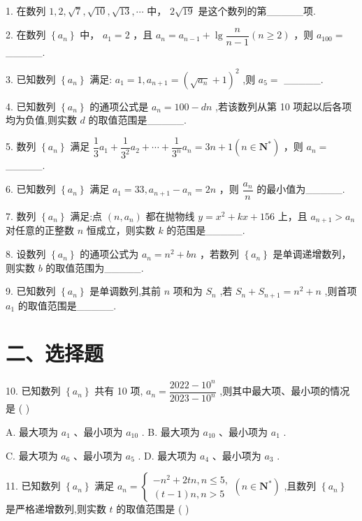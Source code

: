1. 在数列 $1,2,\sqrt{7},\sqrt{10},\sqrt{13},\cdots$ 中， $2\sqrt{19}$ 是这个数列的第\_\_\_\_\_项.

2. 在数列 $\left\{  {a}_{n}\right\}$ 中， ${a}_{1} = 2$ ，且 ${a}_{n} = {a}_{n - 1} + \lg \dfrac{n}{n - 1}\left( {n \geq  2}\right)$ ，则 ${a}_{100} =$ \_\_\_\_\_.

3. 已知数列 $\left\{  {a}_{n}\right\}$ 满足: ${a}_{1} = 1,{a}_{n + 1} = {\left( \sqrt{{a}_{n}} + 1\right) }^{2}$ ,则 ${a}_{5} =$ \_\_\_\_\_.

4. 已知数列 $\left\{  {a}_{n}\right\}$ 的通项公式是 ${a}_{n} = {100} - {dn}$ ,若该数列从第 10 项起以后各项均为负值,则实数 $d$ 的取值范围是\_\_\_\_\_.

5. 数列 $\left\{  {a}_{n}\right\}$ 满足 $\dfrac{1}{3}{a}_{1} + \dfrac{1}{{3}^{2}}{a}_{2} + \cdots  + \dfrac{1}{{3}^{n}}{a}_{n} = {3n} + 1\left( {n \in  {\mathbf{N}}^{ * }}\right)$ ，则 ${a}_{n} =$ \_\_\_\_\_.

6. 已知数列 $\left\{  {a}_{n}\right\}$ 满足 ${a}_{1} = {33},{a}_{n + 1} - {a}_{n} = {2n}$ ，则 $\dfrac{{a}_{n}}{n}$ 的最小值为\_\_\_\_\_.

7. 数列 $\left\{  {a}_{n}\right\}$ 满足:点 $\left( {n,{a}_{n}}\right)$ 都在抛物线 $y = {x}^{2} + {kx} + {156}$ 上，且 ${a}_{n + 1} > {a}_{n}$ 对任意的正整数 $n$ 恒成立，则实数 $k$ 的范围是\_\_\_\_\_.

8. 设数列 $\left\{  {a}_{n}\right\}$ 的通项公式为 ${a}_{n} = {n}^{2} + {bn}$ ，若数列 $\left\{  {a}_{n}\right\}$ 是单调递增数列，则实数 $b$ 的取值范围为\_\_\_\_\_.

9. 已知数列 $\left\{  {a}_{n}\right\}$ 是单调数列,其前 $n$ 项和为 ${S}_{n}$ ,若 ${S}_{n} + {S}_{n + 1} = {n}^{2} + n$ ,则首项 ${a}_{1}$ 的取值范围是\_\_\_\_\_.

\section*{二、选择题}

10. 已知数列 $\left\{  {a}_{n}\right\}$ 共有 10 项, ${a}_{n} = \dfrac{{2022} - {10}^{n}}{{2023} - {10}^{n}}$ ,则其中最大项、最小项的情况是 ( )

A. 最大项为 ${a}_{1}$ 、最小项为 ${a}_{10}$ . B. 最大项为 ${a}_{10}$ 、最小项为 ${a}_{1}$ .

C. 最大项为 ${a}_{6}$ 、最小项为 ${a}_{5}$ . D. 最大项为 ${a}_{4}$ 、最小项为 ${a}_{3}$ .

11. 已知数列 $\left\{  {a}_{n}\right\}$ 满足 ${a}_{n} = \left\{  {\begin{array}{l}  - {n}^{2} + {2tn},n \leq  5, \\  \left( {t - 1}\right) n,n > 5 \end{array}\left( {n \in  {\mathbf{N}}^{ * }}\right) }\right.$ ,且数列 $\left\{  {a}_{n}\right\}$ 是严格递增数列,则实数 $t$ 的取值范围是 ( )

